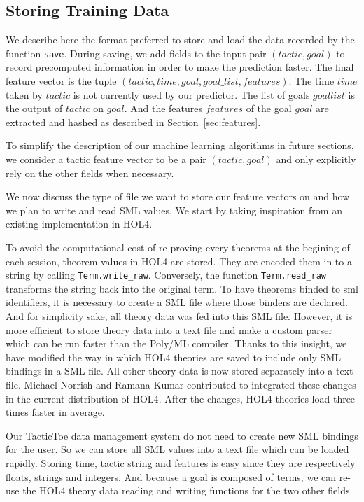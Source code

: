 \documentclass[runningheads,a4paper,draft]{svjour3}
\def\holfour{\textsf{HOL4}\xspace}
\def\sml{\textsf{SML}\xspace}
\def\polyml{\textsf{Poly/ML}\xspace}
\def\tactictoe{\textsf{TacticToe}\xspace}
\begin{document}
\subsection{Storing Training Data}
We describe here the format preferred to store and load the 
data recorded by the function \texttt{save}. 
During saving, we add fields to the input pair $(tactic,goal)$ to record 
precomputed information in order to make the prediction faster. The final 
feature vector is the tuple $(tactic,time,goal,goal\_list,features)$.
The time $time$ taken by $tactic$ is not currently used by our 
predictor. The list of goals $goal list$ is the output of $tactic$ on 
$goal$. And the features $features$ of the goal $goal$ are extracted and hashed 
as described in Section~\ref{sec:features}. 

\begin{remark}
To simplify the description of our machine learning algorithms in future 
sections, we consider a tactic feature vector to be a pair $(tactic,goal)$ and 
only 
explicitly rely on the 
other fields when necessary.
\end{remark}

We now discuss the type of file we want to store our feature vectors on and
how we plan to write and read \sml values. We start by taking 
inspiration from an existing implementation in \holfour.

To avoid the computational cost of re-proving every theorems at the begining of 
each session, theorem values in \holfour are stored.
They are encoded them in to a string by calling \texttt{Term.write\_raw}.
Conversely, the function \texttt{Term.read\_raw} transforms the string back 
into the original term.
To have theorems binded to sml identifiers, it is necessary to create a 
\sml file where those binders are declared. And for simplicity sake, all theory 
data was fed into this \sml file. However, it is
more efficient to store theory data into a text file and make a custom 
parser which can be run faster than the \polyml compiler.
Thanks to this insight, we have 
modified the way in which \holfour theories are saved to include only \sml 
bindings in a \sml file. All other theory data is now stored separately 
into a text file. Michael Norrish and Ramana Kumar contributed to integrated 
these changes in the current distribution of \holfour. After the changes, 
\holfour theories load three times faster in average.

Our \tactictoe data management system do not need to create new \sml
bindings for the user. So we can store all \sml values into a text file which 
can be loaded rapidly.
Storing time, tactic string and features is easy since they are respectively 
floats, strings and integers. And because a goal is composed of terms, we can 
re-use the \holfour theory data reading and writing functions 
for the two other fields.
\end{document}
